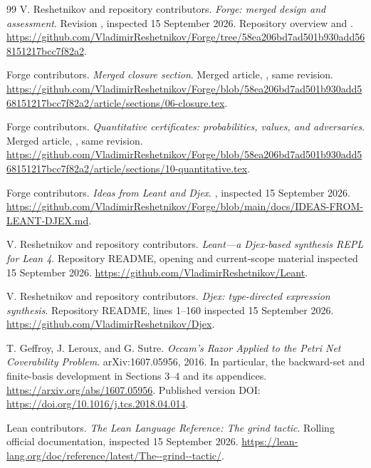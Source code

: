 \begin{thebibliography}{99}
V. Reshetnikov and repository contributors.
\emph{Forge: merged design and assessment}.
Revision , inspected 15 September 2026.
Repository overview and .
\url{https://github.com/VladimirReshetnikov/Forge/tree/58ea206bd7ad501b930add568151217bcc7f82a2}.

Forge contributors.
\emph{Merged closure section}.
Merged article, , same revision.
\url{https://github.com/VladimirReshetnikov/Forge/blob/58ea206bd7ad501b930add568151217bcc7f82a2/article/sections/06-closure.tex}.

Forge contributors.
\emph{Quantitative certificates: probabilities, values, and adversaries}.
Merged article, , same revision.
\url{https://github.com/VladimirReshetnikov/Forge/blob/58ea206bd7ad501b930add568151217bcc7f82a2/article/sections/10-quantitative.tex}.

Forge contributors.
\emph{Ideas from Leant and Djex}.
, inspected 15 September 2026.
\url{https://github.com/VladimirReshetnikov/Forge/blob/main/docs/IDEAS-FROM-LEANT-DJEX.md}.

V. Reshetnikov and repository contributors.
\emph{Leant---a Djex-based synthesis REPL for Lean 4}.
Repository README, opening and current-scope material inspected 15 September 2026.
\url{https://github.com/VladimirReshetnikov/Leant}.

V. Reshetnikov and repository contributors.
\emph{Djex: type-directed expression synthesis}.
Repository README, lines 1--160 inspected 15 September 2026.
\url{https://github.com/VladimirReshetnikov/Djex}.

T. Geffroy, J. Leroux, and G. Sutre.
\emph{Occam's Razor Applied to the Petri Net Coverability Problem}.
arXiv:1607.05956, 2016. In particular, the backward-set and finite-basis development in Sections 3--4 and its appendices.
\url{https://arxiv.org/abs/1607.05956}.
Published version DOI: \url{https://doi.org/10.1016/j.tcs.2018.04.014}.

Lean contributors.
\emph{The Lean Language Reference: The grind tactic}.
Rolling official documentation, inspected 15 September 2026.
\url{https://lean-lang.org/doc/reference/latest/The--grind--tactic/}.


\end{thebibliography}
